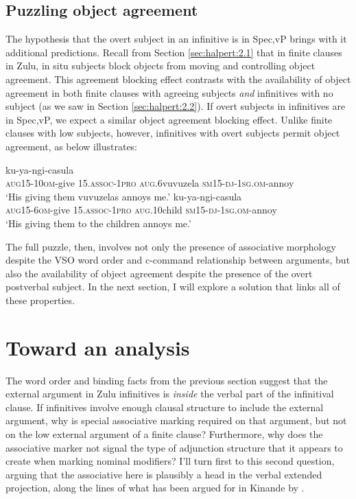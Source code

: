 \documentclass[output=paper,colorlinks,citecolor=brown]{langscibook}
\begin{document}
\subsection{Puzzling object agreement}\label{sec:halpert:3.2}

The hypothesis that the overt subject in an infinitive is in Spec,vP brings with it additional predictions.  Recall from Section \ref{sec:halpert:2.1} that in finite clauses in Zulu, in situ subjects block objects from moving and controlling object agreement. This agreement blocking effect contrasts with the availability of object agreement in both finite clauses with agreeing subjects \textit{and}  infinitives with no subject (as we saw in Section \ref{sec:halpert:2.2}). If overt subjects in infinitives are in Spec,vP, we expect a similar object agreement blocking effect.  Unlike finite clauses with low subjects, however, infinitives with overt subjects permit object agreement, as  below illustrates:

\ea%
    \label{ex:halpert:18}
    \ea%
    \label{ex:halpert:18a}
     ku-ya-ngi-casula\\
            \textsc{aug}15-10\textsc{om}-give 15.\textsc{assoc-1pro} \textsc{aug}.6vuvuzela \textsc{sm}15-\textsc{dj}-1\textsc{sg.om}-annoy \\
    \glt    `His giving them vuvuzelas annoys me.'
    \ex%
    \label{ex:halpert:18b}
     ku-ya-ngi-casula\\
            \textsc{aug}15-6\textsc{om}-give 15.\textsc{assoc-1pro} \textsc{aug}.10child \textsc{sm}15-\textsc{dj}-1\textsc{sg.om}-annoy \\
    \glt    `His giving them to the children annoys me.'
    \z 
\z 

The full puzzle, then, involves not only the presence of associative morphology despite the VSO word order and c-command relationship between arguments, but also the availability of object agreement despite the presence of the overt postverbal subject.  In the next section, I will explore a solution that links all of these properties.

\section{Toward an analysis}\label{sec:halpert:4}

The word order and binding facts from the previous section suggest that the external argument in Zulu infinitives is \textit{inside} the verbal part of the infinitival clause. If infinitives involve enough clausal structure to include the external argument, why is special associative marking required on that argument, but not on the low external argument of a finite clause? Furthermore, why does the associative marker not signal the type of adjunction structure that it appears to create when marking nominal modifiers?  I'll turn first to this second question, arguing that the associative here is plausibly a head in the verbal extended projection, along the lines of what has been argued for in Kinande by \citet{BakerCollins2006}.
\end{document}
